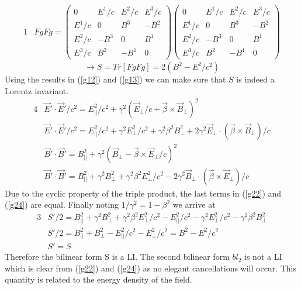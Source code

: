 \documentclass[]{article}
\numberwithin{equation}{subsection}
\begin{document}
\begin{alignat}{1}
	\label{g20}	&FgFg=
		\begin{pmatrix}
		0&E^{1}/c&E^{2}/c&E^{3}/c\\
		E^{1}/c&0&B^{3}&-B^{2}\\
		E^{2}/c&-B^{3}&0&B^{1}\\
		E^{3}/c&B^{2}&-B^{1}&0	
	\end{pmatrix}
		\begin{pmatrix}
		0&E^{1}/c&E^{2}/c&E^{3}/c\\
		E^{1}/c&0&B^{3}&-B^{2}\\
		E^{2}/c&-B^{3}&0&B^{1}\\
		E^{3}/c&B^{2}&-B^{1}&0	
	\end{pmatrix}
\end{alignat}
$$
	\rightarrow S=Tr[FgFg]=2(B^{2}-E^{2}/c^{2})
$$
Using the results in (\ref{g12}) and (\ref{g13}) we can make sure that $S$ is indeed a Lorentz invariant.
\begin{alignat}{4}
	\label{g21}	&\vec{E}'\cdot\vec{E}'/c^{2}=E^{2}_{||}/c^{2}+\gamma^{2}(\vec{E}_{\perp}/c+\vec{\beta}\times\vec{B}_{\perp})^{2}\\
	\label{g22}	&\vec{E}'\cdot\vec{E}'/c^{2}=E^{2}_{||}/c^{2}+\gamma^{2}E^{2}_{\perp}/c^{2}+\gamma^{2}\beta^{2}B^{2}_{\perp}+2\gamma^{2}\vec{E}_{\perp}\cdot(\vec{\beta}\times\vec{B}_{\perp})/c\\
	\label{g23}	&\vec{B}'\cdot\vec{B}'=B^{2}_{||}+\gamma^{2}(\vec{B}_{\perp}-\vec{\beta}\times\vec{E}_{\perp}/c)^{2}\\
	\label{g24}	&\vec{B}'\cdot\vec{B}'=B^{2}_{||}+\gamma^{2}B^{2}_{\perp}+\gamma^{2}\beta^{2}E^{2}_{\perp}/c^{2}-2\gamma^{2}\vec{B}_{\perp}\cdot(\vec{\beta}\times\vec{E}_{\perp})/c
\end{alignat}
Due to the cyclic property of the triple product, the last terms in (\ref{g22}) and (\ref{g24}) are equal. Finally noting $1/\gamma^{2}=1-\beta^{2}$ we arrive at
\begin{alignat}{3}
	\label{g25}	&S'/2=B^{2}_{||}+\gamma^{2}B^{2}_{\perp}+\gamma^{2}\beta^{2}E^{2}_{\perp}/c^{2}-E^{2}_{||}/c^{2}-\gamma^{2}E^{2}_{\perp}/c^{2}-\gamma^{2}\beta^{2}B^{2}_{\perp}\\
	\label{g26}	&S'/2=B^{2}_{||}+B^{2}_{\perp}-E^{2}_{||}/c^{2}-E^{2}_{\perp}/c^{2}=B^{2}-E^{2}/c^{2}\\
	\label{g27}	&S'=S
\end{alignat}
Therefore the bilinear form S is a LI. The second bilinear form $bl_{2}$ is not a LI which is clear from (\ref{g22}) and (\ref{g24}) as no elegant cancellations will occur. This quantity is related to the energy density of the field. 
\end{document}
